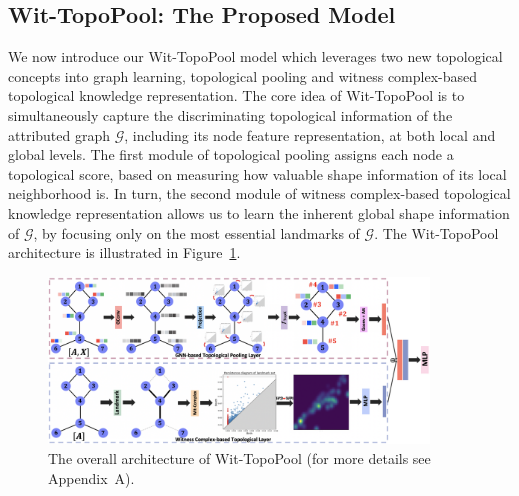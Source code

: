\documentclass[letterpaper]{article} %
\begin{document}
\subsection{Wit-TopoPool: The Proposed Model}
We now introduce our Wit-TopoPool model which leverages two new topological concepts into graph learning, topological pooling and witness complex-based topological knowledge representation. The core idea of Wit-TopoPool is to simultaneously capture the discriminating topological information of the attributed graph $\mathcal{G}$, including its node feature representation, at both local and global levels. The first module of topological pooling assigns each node a topological score, based on measuring how valuable shape information of its local neighborhood is. In turn, the second module
of witness complex-based topological knowledge representation allows us to learn the inherent global shape information of $\mathcal{G}$, by focusing only on the most essential landmarks of $\mathcal{G}$. The Wit-TopoPool architecture is illustrated in Figure~\ref{flowchart}.
\begin{figure}[t!]
\centering
\includegraphics[width=0.9\textwidth]{Figures/Wit_TopoPool_updated_flowchart_v2.png}
\caption{The overall architecture of Wit-TopoPool  (for more details see Appendix~A).\label{flowchart}}
\end{figure}
\end{document}
